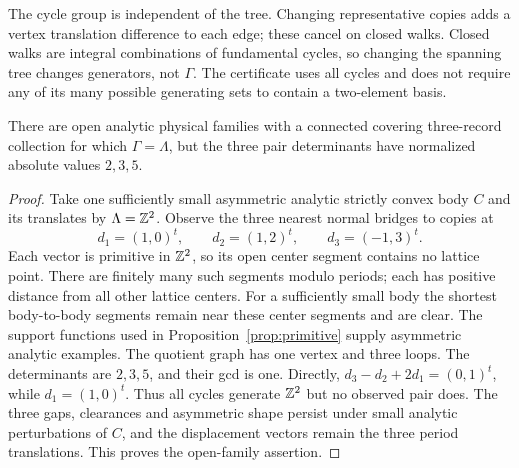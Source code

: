 The cycle group is independent of the tree. Changing representative
copies adds a vertex translation difference to each edge; these cancel
on closed walks. Closed walks are integral combinations of fundamental
cycles, so changing the spanning tree changes generators, not $\Gamma$.
The certificate uses all cycles and does not require any of its many
possible generating sets to contain a two-element basis.

\begin{proposition}
\label{prop:no-primitive-pair}
There are open analytic physical families with a connected covering
three-record collection for which $\Gamma=\Lambda$, but the three
pair determinants have normalized absolute values $2,3,5$.
\end{proposition}
\begin{proof}
Take one sufficiently small asymmetric analytic strictly convex body
$C$ and its translates by $\Lambda=\mathbb Z^2$. Observe the three nearest
normal bridges to copies at
\[
        d_1=(1,0)^t,\qquad d_2=(1,2)^t,\qquad d_3=(-1,3)^t.
\]
Each vector is primitive in $\mathbb Z^2$, so its open center segment contains
no lattice point. There are finitely many such segments modulo periods;
each has positive distance from all other lattice centers. For a
sufficiently small body the shortest body-to-body segments remain near
these center segments and are clear. The support functions used in
Proposition~\ref{prop:primitive} supply asymmetric analytic examples.
The quotient graph has one vertex and three loops. The determinants are
$2,3,5$, and their gcd is one. Directly,
$d_3-d_2+2d_1=(0,1)^t$, while $d_1=(1,0)^t$.
Thus all cycles generate $\mathbb Z^2$ but no observed pair does.
The three gaps, clearances and asymmetric shape persist under small
analytic perturbations of $C$, and the displacement vectors remain the
three period translations. This proves the open-family assertion.
\end{proof}

